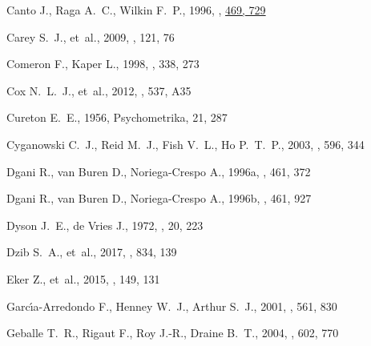 \documentclass[useAMS, usenatbib, a4paper]{mnras}
\begin{document}
\begin{thebibliography}{}
{Canto} J.,  {Raga} A.~C.,   {Wilkin} F.~P.,  1996, , \href {http://adsabs.harvard.edu/abs/1996ApJ...469..729C}
  {469, 729}

{Carey} S.~J.,  et~al., 2009, \pasp, 121, 76

{Comeron} F.,  {Kaper} L.,  1998, \aap, 338, 273

{Cox} N.~L.~J.,  et~al., 2012, \aap, 537, A35

Cureton E.~E.,  1956, Psychometrika, 21, 287

{Cyganowski} C.~J.,  {Reid} M.~J.,  {Fish} V.~L.,   {Ho} P.~T.~P.,  2003, \apj,
  596, 344

{Dgani} R.,  {van Buren} D.,   {Noriega-Crespo} A.,  1996a, \apj, 461, 372

{Dgani} R.,  {van Buren} D.,   {Noriega-Crespo} A.,  1996b, \apj, 461, 927

{Dyson} J.~E.,  {de Vries} J.,  1972, \aap, 20, 223

{Dzib} S.~A.,  et~al., 2017, \apj, 834, 139

{Eker} Z.,  et~al., 2015, \aj, 149, 131

{Garc{\'{\i}}a-Arredondo} F.,  {Henney} W.~J.,   {Arthur} S.~J.,  2001, \apj,
  561, 830

{Geballe} T.~R.,  {Rigaut} F.,  {Roy} J.-R.,   {Draine} B.~T.,  2004, \apj,
  602, 770


\end{thebibliography}
\end{document}
